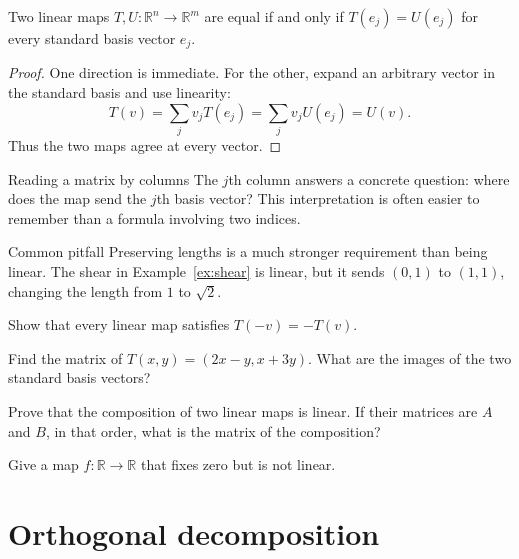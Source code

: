 \documentclass{hubbardbook}
\newcommand{\R}{\mathbb{R}}
\begin{document}
\begin{boxedtheorem}\label{thm:basis}
Two linear maps \(T,U\colon\R^n\to\R^m\) are equal if and only if
\(T(e_j)=U(e_j)\) for every standard basis vector \(e_j\).
\end{boxedtheorem}
\begin{proof}
One direction is immediate. For the other, expand an arbitrary vector
in the standard basis and use linearity:
\[
  T(v)=\sum_jv_jT(e_j)=\sum_jv_jU(e_j)=U(v).
\]
Thus the two maps agree at every vector.
\end{proof}

\begin{textbox}{Reading a matrix by columns}
The \(j\)th column answers a concrete question: where does the map send
the \(j\)th basis vector? This interpretation is often easier to remember
than a formula involving two indices.
\end{textbox}

\begin{shadedbox}{Common pitfall}
Preserving lengths is a much stronger requirement than being linear.
The shear in Example~\ref{ex:shear} is linear, but it sends \((0,1)\)
to \((1,1)\), changing the length from \(1\) to \(\sqrt2\).
\end{shadedbox}

\begin{exercises}
\begin{exercise}\label{exercise:zero}
Show that every linear map satisfies \(T(-v)=-T(v)\).
\end{exercise}
\begin{exercise}
Find the matrix of \(T(x,y)=(2x-y,x+3y)\). What are the images of
the two standard basis vectors?
\end{exercise}
\begin{exercise}[Composition]
Prove that the composition of two linear maps is linear. If their
matrices are \(A\) and \(B\), in that order, what is the matrix of
the composition?
\end{exercise}
\begin{exercise}
Give a map \(f\colon\R\to\R\) that fixes zero but is not linear.
\end{exercise}
\end{exercises}

\chapter{Orthogonal decomposition}
\end{document}
